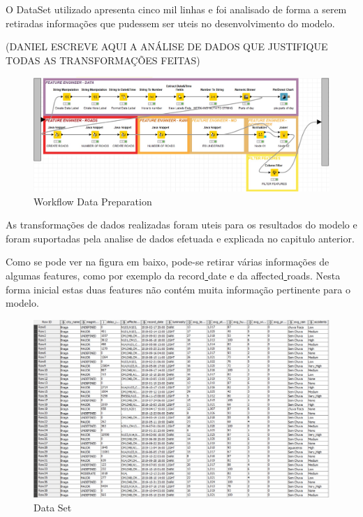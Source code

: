 \documentclass[a4paper,10pt]{article}
\begin{document}
O DataSet utilizado apresenta cinco mil linhas e foi analisado de forma a serem retiradas informações que pudessem ser uteis no desenvolvimento do modelo. 
 

(DANIEL ESCREVE AQUI A ANÁLISE DE DADOS QUE JUSTIFIQUE TODAS AS TRANSFORMAÇÕES FEITAS)

\begin{figure} [ h! ]
  \centering
  \includegraphics[width=\linewidth]{imagens/DATAPREPARATION.jpg}
  \caption{Workflow Data Preparation}
  \label{fig:DATAPREPARATION}
\end{figure}

As transformações de dados realizadas foram uteis para os resultados do modelo e foram suportadas pela analise de dados efetuada e explicada no capitulo anterior. 


Como se pode ver na figura em baixo, pode-se retirar várias informações de algumas features, como por exemplo da record\underline{ }date e da affected\underline{ }roads. Nesta forma inicial estas duas features não contém muita informação pertinente para o modelo. 

\begin{figure} [ h! ]
  \centering
  \includegraphics[width=\linewidth]{imagens/DATASET.jpg}
  \caption{Data Set}
  \label{fig:DATASET}
\end{figure}
\end{document}
